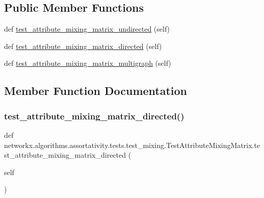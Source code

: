 \subsection*{Public Member Functions}
\begin{DoxyCompactItemize}
\item 
def \hyperlink{classnetworkx_1_1algorithms_1_1assortativity_1_1tests_1_1test__mixing_1_1TestAttributeMixingMatrix_a74292a56ab52a8abbe7f3a11209867dc}{test\+\_\+attribute\+\_\+mixing\+\_\+matrix\+\_\+undirected} (self)
\item 
def \hyperlink{classnetworkx_1_1algorithms_1_1assortativity_1_1tests_1_1test__mixing_1_1TestAttributeMixingMatrix_a625ba77fe3fca7cfcbf489d06c42f5d1}{test\+\_\+attribute\+\_\+mixing\+\_\+matrix\+\_\+directed} (self)
\item 
def \hyperlink{classnetworkx_1_1algorithms_1_1assortativity_1_1tests_1_1test__mixing_1_1TestAttributeMixingMatrix_a54a76480090233a2838f4fac498eb3b4}{test\+\_\+attribute\+\_\+mixing\+\_\+matrix\+\_\+multigraph} (self)
\end{DoxyCompactItemize}


\subsection{Member Function Documentation}
\mbox{\label{classnetworkx_1_1algorithms_1_1assortativity_1_1tests_1_1test__mixing_1_1TestAttributeMixingMatrix_a625ba77fe3fca7cfcbf489d06c42f5d1}} 
\subsubsection{\texorpdfstring{test\+\_\+attribute\+\_\+mixing\+\_\+matrix\+\_\+directed()}{test\_attribute\_mixing\_matrix\_directed()}}
{\footnotesize\ttfamily def networkx.\+algorithms.\+assortativity.\+tests.\+test\+\_\+mixing.\+Test\+Attribute\+Mixing\+Matrix.\+test\+\_\+attribute\+\_\+mixing\+\_\+matrix\+\_\+directed (\begin{DoxyParamCaption}\item[{}]{self }\end{DoxyParamCaption})}

